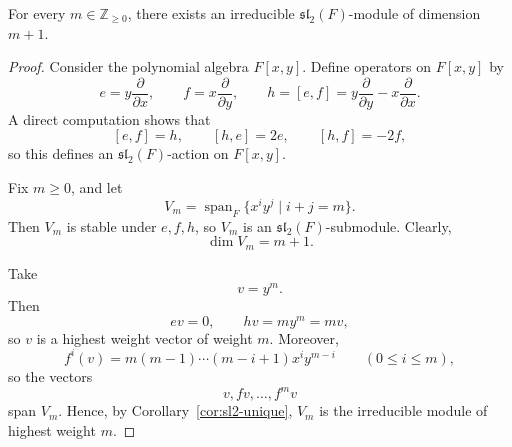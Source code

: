 \begin{proposition}\label{prop:existence-all-dimensions}
    For every \(m\in\mathbb Z_{\ge 0}\), there exists an irreducible \(\mathfrak{sl}_2(F)\)-module of dimension \(m+1\).
\end{proposition}

\begin{proof}
    Consider the polynomial algebra \(F[x,y]\). Define operators on \(F[x,y]\) by
    \[
        e=y\frac{\partial}{\partial x},\qquad
        f=x\frac{\partial}{\partial y},\qquad
        h=[e,f]=y\frac{\partial}{\partial y}-x\frac{\partial}{\partial x}.
    \]
    A direct computation shows that
    \[
        [e,f]=h,\qquad [h,e]=2e,\qquad [h,f]=-2f,
    \]
    so this defines an \(\mathfrak{sl}_2(F)\)-action on \(F[x,y]\).

    Fix \(m\ge 0\), and let
    \[
        V_m=\operatorname{span}_F\{x^iy^j\mid i+j=m\}.
    \]
    Then \(V_m\) is stable under \(e,f,h\), so \(V_m\) is an \(\mathfrak{sl}_2(F)\)-submodule. Clearly,
    \[
        \dim V_m=m+1.
    \]

    Take
    \[
        v=y^m.
    \]
    Then
    \[
        ev=0,\qquad hv=my^m=mv,
    \]
    so \(v\) is a highest weight vector of weight \(m\). Moreover,
    \[
        f^i(v)=m(m-1)\cdots(m-i+1)x^iy^{m-i}\qquad (0\le i\le m),
    \]
    so the vectors
    \[
        v,fv,\dots,f^mv
    \]
    span \(V_m\). Hence, by Corollary~\ref{cor:sl2-unique}, \(V_m\) is the irreducible module of highest weight \(m\).
\end{proof}

